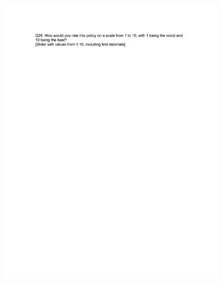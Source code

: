 \documentclass[12pt,econ]{sources/authesis}
\makeatletter
\def\maxwidth{\ifdim\Gin@nat@width>\linewidth\linewidth
\else\Gin@nat@width\fi}
\let\Oldincludegraphics\includegraphics
\renewcommand{\includegraphics}[1]{\Oldincludegraphics[width=\maxwidth]{#1}}
\makeatother
\begin{document}
\begin{figure}[hbt]
  \centering
\includegraphics{data/framing/appendix/questionnaire/questionnaire16.jpg}
\end{figure}
\end{document}
